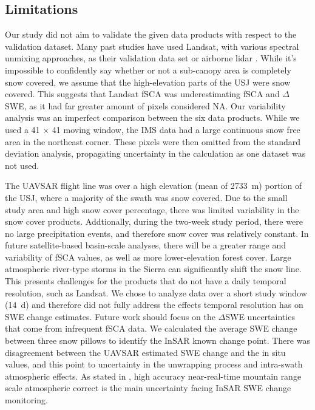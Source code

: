 \hypertarget{ch5-discussion-2}{\subsection{Limitations}\label{ch4-discussion-2}}

Our study did not aim to validate the given data products with respect to the validation dataset. Many past studies have used Landsat, with various spectral unmixing approaches, as their validation data set \citep{painterRetrievalSubpixelSnow2009,rittgerAssessmentMethodsMapping2013} or airborne lidar \citep{stillingerLandsatMODISVIIRS2023}. While it's impossible to confidently say whether or not a sub-canopy area is completely snow covered, we assume that the high-elevation parts of the USJ were snow covered. This suggests that Landsat fSCA was underestimating fSCA and $\Delta$SWE, as it had far greater amount of pixels considered NA. Our variability analysis was an imperfect comparison between the six data products. While we used a 41 $\times$ 41 moving window, the IMS data had a large continuous snow free area in the northeast corner. These pixels were then omitted from the standard deviation analysis, propagating uncertainty in the calculation as one dataset was not used.

The UAVSAR flight line was over a high elevation (mean of 2733~m) portion of the USJ, where a majority of the swath was snow covered. Due to the small study area and high snow cover percentage, there was limited variability in the snow cover products. Addtionally, during the two-week study period, there were no large precipitation events, and therefore snow cover was relatively constant. In future satellite-based basin-scale analyses, there will be a greater range and variability of fSCA values, as well as more lower-elevation forest cover. Large atmospheric river-type storms in the Sierra can significantly shift the snow line. This presents challenges for the products that do not have a daily temporal resolution, such as Landsat. We chose to analyze data over a short study window (14~d) and therefore did not fully address the effects temporal resolution has on SWE change estimates. Future work should focus on the $\Delta$SWE uncertainties that come from infrequent fSCA data.
We calculated the average SWE change between three snow pillows to identify the InSAR known change point. There was disagreement between the UAVSAR estimated SWE change and the in situ values, and this point to uncertainty in the unwrapping process and intra-swath atmospheric effects. As stated in \cite{tarriconeEstimatingSnowAccumulation2023a}, high accuracy near-real-time mountain range scale atmospheric correct is the main uncertainty facing InSAR SWE change monitoring.


